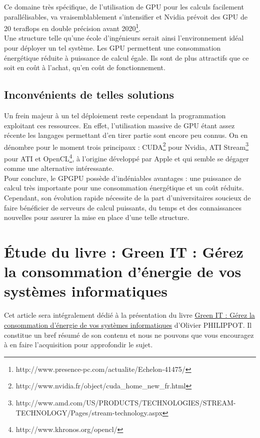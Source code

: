 \documentclass[a4paper,11pt,french]{article}
\begin{document}
Ce domaine très spécifique, de l'utilisation de GPU pour les calculs facilement parallélisables, va vraisemblablement s’intensifier et Nvidia prévoit des GPU de 20 teraflops en double précision avant 2020\footnote{\textsf{http://www.presence-pc.com/actualite/Echelon-41475/}}.\\

Une structure telle qu’une école d’ingénieurs serait ainsi l’environnement idéal pour déployer un tel système. Les GPU permettent une consommation énergétique réduite à puissance de calcul égale. Ils sont de plus attractifs que ce soit en coût à l’achat, qu’en coût de fonctionnement.\\

\subsection{Inconvénients de telles solutions}
Un frein majeur à un tel déploiement reste cependant la programmation exploitant ces ressources. En effet, l'utilisation massive de GPU étant assez récente les langages permettant d'en tirer partie sont encore peu connus. On en dénombre pour le moment trois principaux : CUDA\footnote{\textsf{http://www.nvidia.fr/object/cuda\_{}home\_{}new\_{}fr.html}} pour Nvidia, ATI Stream\footnote{\textsf{http://www.amd.com/US/PRODUCTS/TECHNOLOGIES/STREAM-TECHNOLOGY/Pages/stream-technology.aspx}} pour ATI et OpenCL\footnote{\textsf{http://www.khronos.org/opencl/}}, à l'origine développé par Apple et qui semble se dégager comme une alternative intéressante.\\

Pour conclure, le GPGPU possède d'indéniables avantages : une puissance de calcul très importante pour une consommation énergétique et un coût réduits. Cependant, son évolution rapide nécessite de la part d'universitaires soucieux de faire bénéficier de serveurs de calcul puissants, du temps et des connaissances nouvelles pour assurer la mise en place d'une telle structure.\\




\section[\'Etude d'un livre]{\'Etude du livre : \og Green IT : Gérez la consommation d'énergie de vos systèmes informatiques \fg}

Cet article sera intégralement dédié à la présentation du livre \underline{Green IT : Gérez la consommation d'énergie de vos systèmes informatiques} d’Olivier PHILIPPOT. Il constitue un bref résumé de son contenu et nous ne pouvons que vous encouragez à en faire l’acquisition pour approfondir le sujet.\\
\end{document}
